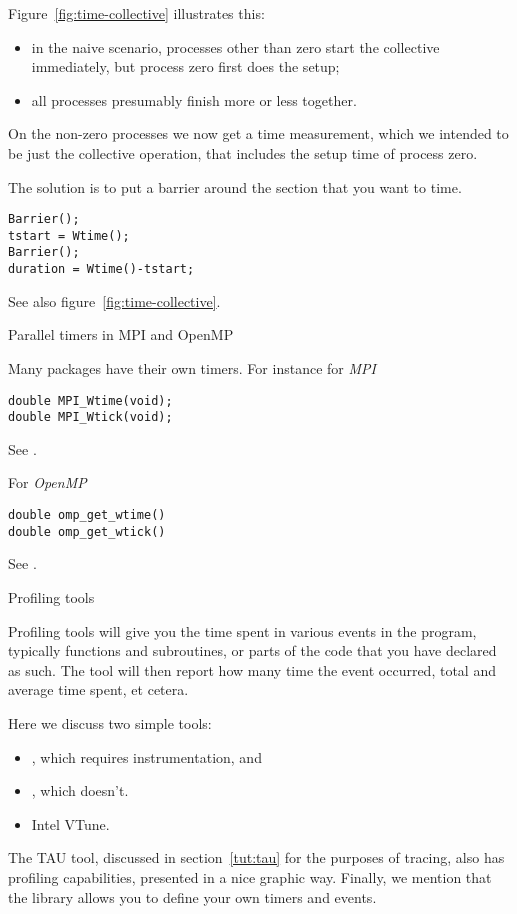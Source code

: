 Figure~\ref{fig:time-collective} illustrates this:
\begin{itemize}
\item in the naive scenario, processes other than zero start the collective immediately,
  but process zero first does the setup;
\item all processes presumably finish more or less together.
\end{itemize}
On the non-zero processes we now get a time measurement,
which we intended to be just the collective operation,
that includes the setup time of process zero.

The solution is to put a barrier around the section that you want to time.
\begin{lstlisting}
Barrier();
tstart = Wtime();
Barrier();
duration = Wtime()-tstart;
\end{lstlisting}
See also figure~\ref{fig:time-collective}.

 {Parallel timers in MPI and OpenMP}

Many packages have their own timers. For instance for
\emph{MPI}
\begin{lstlisting}
double MPI_Wtime(void);
double MPI_Wtick(void);
\end{lstlisting}
See .

For
\emph{OpenMP}
\begin{lstlisting}
double omp_get_wtime()
double omp_get_wtick()
\end{lstlisting}
See .

 {Profiling tools}

Profiling tools will give you the time spent in various events in the
program, typically functions and subroutines, or parts of the code
that you have declared as such. The tool will then report how many
time the event occurred, total and average time spent, et cetera.

Here we discuss two simple tools:
\begin{itemize}
\item {}, which requires instrumentation, and
\item {}, which doesn't.
\item Intel VTune.
\end{itemize}

The TAU tool, discussed in section~\ref{tut:tau} for the purposes of tracing,
also has profiling capabilities, presented in a nice graphic way.
Finally, we mention that the  library
allows you to define your own timers and events.

